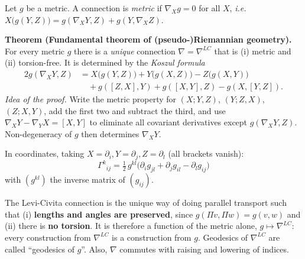 \documentclass[11pt,a4paper]{article}
\numberwithin{equation}{section}
\theoremstyle{definition}
\theoremstyle{plain}
\newcommand{\ie}{\emph{i.e.}\ }
\begin{document}
\begin{formal}
Let $g$ be a metric. A connection is \emph{metric} if $\nabla_Xg=0$ for all $X$, \ie $X\big(g(Y,Z)\big)=g(\nabla_XY,Z)+g(Y,\nabla_XZ)$.

\textbf{Theorem (Fundamental theorem of (pseudo-)Riemannian geometry).} For every metric $g$ there is a \emph{unique} connection $\nabla=\nabla^{LC}$ that is (i) metric and (ii) torsion-free. It is determined by the \emph{Koszul formula}
\begin{align*}
2g(\nabla_XY,Z)&=X\big(g(Y,Z)\big)+Y\big(g(X,Z)\big)-Z\big(g(X,Y)\big)\\
&\quad+g([Z,X],Y)+g([X,Y],Z)-g(X,[Y,Z]).
\end{align*}
\emph{Idea of the proof.} Write the metric property for $(X;Y,Z)$, $(Y;Z,X)$, $(Z;X,Y)$, add the first two and subtract the third, and use $\nabla_XY-\nabla_YX=[X,Y]$ to eliminate all covariant derivatives except $g(\nabla_XY,Z)$. Non-degeneracy of $g$ then determines $\nabla_XY$.

In coordinates, taking $X=\partial_i,Y=\partial_j,Z=\partial_l$ (all brackets vanish):
\begin{equation}\label{eq:christmetric}
\boxed{\ \Gamma^k{}_{ij}=\tfrac12\,g^{kl}\big(\partial_ig_{jl}+\partial_jg_{il}-\partial_lg_{ij}\big)\ }
\end{equation}
with $(g^{kl})$ the inverse matrix of $(g_{ij})$.
\end{formal}
\begin{intuition}
The Levi-Civita connection is the unique way of doing parallel transport such that (i) \textbf{lengths and angles are preserved}, since $g(\Pi v,\Pi w)=g(v,w)$ and (ii) there is \textbf{no torsion}. It is therefore a function of the metric alone, $g\mapsto\nabla^{LC}$: every construction from $\nabla^{LC}$ is a construction from $g$. Geodesics of $\nabla^{LC}$ are called ``geodesics of $g$''. Also, $\nabla$ commutes with raising and lowering of indices.
\end{intuition}
\end{document}
